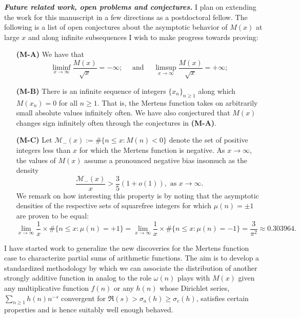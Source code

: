 \documentclass[10pt,reqno,letterpaper]{article}
\theoremstyle{plain}
\numberwithin{theorem}{section}
\theoremstyle{definition}
\begin{document}
\vskip -0.5mm
\noindent
{\normalsize \textbf{\emph{Future related work, open problems and conjectures.}}} 
I plan on extending the work for this manuscript in a few directions 
as a postdoctoral fellow. 
The following is a list of open conjectures about the asymptotic behavior of $M(x)$ at 
large $x$ and along infinite subsequences I wish to make progress towards proving: 
\begin{itemize}[leftmargin=0.475in,itemsep=-1.4mm,topsep=0pt]

\item[\textbf{(M-A)}] We have that 
     \[
     \liminf_{x \rightarrow \infty} \frac{M(x)}{\sqrt{x}} = -\infty; 
     \quad\text{ and }\quad 
     \limsup_{x \rightarrow \infty} \frac{M(x)}{\sqrt{x}} = +\infty;
     \]
\item[\textbf{(M-B)}] There is an infinite sequence of integers $\{x_n\}_{n \geq 1}$ 
                      along which $M(x_n) = 0$ for all $n \geq 1$. That is, the Mertens 
                      function takes on arbitrarily small absolute values infinitely often. 
                      We have also conjectured that $M(x)$ 
                      changes sign infinitely often through the conjectures in \textbf{(M-A)}. 
\item[\textbf{(M-C)}] Let $\mathcal{M}_{-}(x) := \#\{n \leq x: M(n) < 0\}$ denote 
                      the set of positive integers less than $x$ for which the Mertens function 
                      is negative. As $x \rightarrow \infty$, the values of $M(x)$ assume a 
                      pronounced negative bias insomuch as the density 
                      \[
                      \frac{\mathcal{M}_{-}(x)}{x} > \frac{3}{5}(1+o(1)), \text{ as } x \rightarrow \infty. 
                      \]
                      We remark on how interesting this property is by noting that the asymptotic 
                      densities of the respective sets of squarefree integers for which 
                      $\mu(n) = \pm 1$ are proven to be equal: 
                      \[
                      \lim_{x \rightarrow \infty} \frac{1}{x} \times \#\{n \leq x: \mu(n) = +1\} = 
                      \lim_{x \rightarrow \infty} \frac{1}{x} \times \#\{n \leq x: \mu(n) = -1\} = 
                      \frac{3}{\pi^2} \approx 0.303964. 
                 \]

\end{itemize}
I have started work to generalize the new discoveries for the Mertens function case to 
characterize partial sums of arithmetic functions. 
The aim is to develop a standardized methodology by which we can associate the distribution of another  
strongly additive function in analog to the role $\omega(n)$ plays with $M(x)$ given any 
multiplicative function $f(n)$ or any $h(n)$ whose Dirichlet series, 
$\sum_{n \geq 1} h(n) n^{-s}$ convergent for 
$\Re(s) > \sigma_{a}(h) \geq \sigma_{c}(h)$, satisfies 
certain properties and is hence suitably well enough behaved. 
\end{document}
